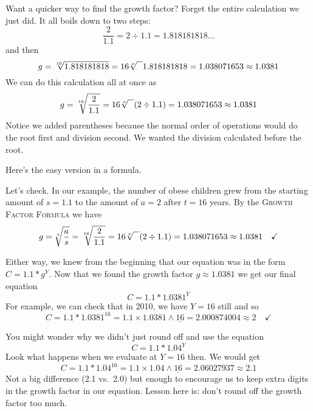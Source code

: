 Want a quicker way to find the growth factor?  Forget the entire calculation we just did.  %
It all boils down to two steps: $$\frac{2}{1.1} = 2 \div 1.1 = 1.818181818\ldots$$
and then $$g =  \sqrt[16]{1.818181818} = 16 \sqrt[x]{\text{\raisebox{.6em}{~\text{  }}}} 1.818181818 = 1.038071653 \approx 1.0381$$
We can do this calculation all at once as
 $$g =  \sqrt[16]{\frac{2}{1.1}} = 16 \sqrt[x]{\text{\raisebox{.6em}{~\text{  }}}} (2 \div 1.1)= 1.038071653 \approx 1.0381$$
Notice we added parentheses because the normal order of operations would do the root first and division second.  We wanted the division calculated before the root.  

Here's the easy version in a formula.

 \bigskip
  \bigskip

\noindent  Let's check.  In our example, the number of obese children grew from the starting amount of $s=1.1$ to the amount of $a=2$ after $t=16$ years.  By the \textsc{Growth Factor Formula} we have 
$$g =  \sqrt[t]{\frac{a}{s}} \\
=  \sqrt[16]{\frac{2}{1.1}} \\
= 16 \sqrt[x]{\text{\raisebox{.6em}{~\text{  }}}}  (2 \div 1.1) \\
= 1.038071653 \approx 1.0381 \quad \checkmark$$

Either way, we knew from the beginning that our equation was in the form
$C = 1.1 \ast g^Y$.  Now that we found the growth factor $g \approx 1.0381$ we get our final equation $$C = 1.1 \ast 1.0381^Y$$
For example, we can check that in 2010, we have $Y=16$ still and so 
$$C = 1.1 \ast 1.0381^{16} = 1.1 \times 1.0381 \wedge \underline{16} =  2.000874004 \approx 2 \quad \checkmark$$ 

You might wonder why we didn't just round off and use the equation $$C = 1.1 \ast 1.04^Y$$ 
Look what happens when we evaluate at $Y=16$ then.  We would get
$$C = 1.1 \ast1.04^{16} = 1.1 \times 1.04 \wedge \underline{16} = 2.06027937 \approx 2.1$$
Not a big difference (2.1 vs.\ 2.0) but enough to encourage us to keep extra digits in the growth factor in our equation.  Lesson here is:  don't round off the growth factor too much.

